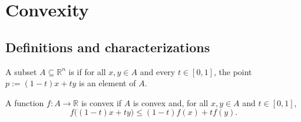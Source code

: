 
\section{Convexity}
\label{sec:convexity}

\subsection{Definitions and characterizations}

\begin{definition}
\label{def:convex_set_function}
A subset $A \subseteq \mathbb{R}^n$ is   if for all
$x,y \in A$ and every $t \in [0,1]$, the point $p := (1-t)x+ty$ is an element of $A$.

A function $f : A \to \mathbb{R}$ is convex if $A$ is convex and, for all $x,y \in A$ and
$t \in [0,1]$,
\[f\big((1-t)x+ty\big) \leq (1-t)f(x)+tf(y).\]
\end{definition}

